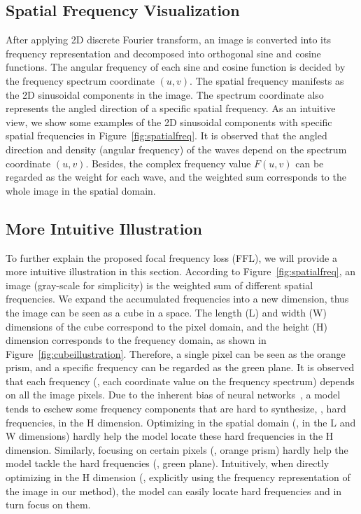 \documentclass[10pt,twocolumn,letterpaper]{article}
\begin{document}
\subsection{Spatial Frequency Visualization}
\label{sec:spatialfreqvis}
After applying 2D discrete Fourier transform, an image is converted into its frequency representation and decomposed into orthogonal sine and cosine functions.
The angular frequency of each sine and cosine function is decided by the frequency spectrum coordinate $\left(u,v\right)$.
The spatial frequency manifests as the 2D sinusoidal components in the image.
The spectrum coordinate also represents the angled direction of a specific spatial frequency.
As an intuitive view, we show some examples of the 2D sinusoidal components with specific spatial frequencies in Figure~\ref{fig:spatialfreq}.
It is observed that the angled direction and density (angular frequency) of the waves depend on the spectrum coordinate $\left(u,v\right)$.
Besides, the complex frequency value $F\left(u,v\right)$ can be regarded as the weight for each wave, and the weighted sum corresponds to the whole image in the spatial domain.



\subsection{More Intuitive Illustration}
\label{sec:intuitiveunders}
To further explain the proposed focal frequency loss (FFL), we will provide a more intuitive illustration in this section.
According to Figure~\ref{fig:spatialfreq}, an image (gray-scale for simplicity) is the weighted sum of different spatial frequencies. We expand the accumulated frequencies into a new dimension, thus the image can be seen as a cube in a space. The length (L) and width (W) dimensions of the cube correspond to the pixel domain, and the height (H) dimension corresponds to the frequency domain, as shown in Figure~\ref{fig:cubeillustration}. Therefore, a single pixel can be seen as the orange prism, and a specific frequency can be regarded as the green plane.
It is observed that each frequency (\ie, each coordinate value on the frequency spectrum) depends on all the image pixels. Due to the inherent bias of neural networks~\cite{spectralbias,fprinciple}, a model tends to eschew some frequency components that are hard to synthesize, \ie, hard frequencies, in the H dimension. Optimizing in the spatial domain (\ie, in the L and W dimensions) hardly help the model locate these hard frequencies in the H dimension. Similarly, focusing on certain pixels (\eg, orange prism) hardly help the model tackle the hard frequencies (\eg, green plane). Intuitively, when directly optimizing in the H dimension (\ie, explicitly using the frequency representation of the image in our method), the model can easily locate hard frequencies and in turn focus on them.
\end{document}

